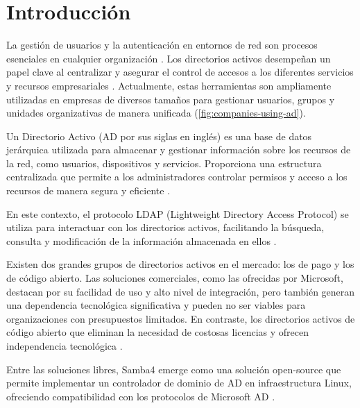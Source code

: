 \section{Introducción}

La gestión de usuarios y la autenticación en entornos de red son procesos esenciales en cualquier organización \autocite{thakur_user_2015-1, josang_local_2015, kizza_access_2024}. Los directorios activos desempeñan un papel clave al centralizar y asegurar el control de accesos a los diferentes servicios y recursos empresariales \autocite{kizza_access_2024}. Actualmente, estas herramientas son ampliamente utilizadas en empresas de diversos tamaños para gestionar usuarios, grupos y unidades organizativas de manera unificada (\autoref{fig:companies-using-ad}).

Un Directorio Activo (AD por sus siglas en inglés) es una base de datos jerárquica utilizada para almacenar y gestionar información sobre los recursos de la red, como usuarios, dispositivos y servicios. Proporciona una estructura centralizada que permite a los administradores controlar permisos y acceso a los recursos de manera segura y eficiente  \autocite{allen_active_2003,thakur_user_2015,carter_ldap_2003,francis_mastering_2021,smirnov_building_2024}.

En este contexto, el protocolo LDAP (Lightweight Directory Access Protocol) se utiliza para interactuar con los directorios activos, facilitando la búsqueda, consulta y modificación de la información almacenada en ellos \autocite{harrison_lightweight_2006,sermersheim_lightweight_2006,bartlett_samba_2005,voglmaier_abcs_2003,redhat_what_2022,janice_ldap_2023}.

Existen dos grandes grupos de directorios activos en el mercado: los de pago y los de código abierto. Las soluciones comerciales, como las ofrecidas por Microsoft, destacan por su facilidad de uso y alto nivel de integración, pero también generan una dependencia tecnológica significativa y pueden no ser viables para organizaciones con presupuestos limitados. En contraste, los directorios activos de código abierto que eliminan la necesidad de costosas licencias y ofrecen independencia tecnológica \autocite{thakur_user_2015-1,bartlett_samba_2005,imanudin_active_2019,boulanger_open-source_2005,bonaccorsi_why_2003}.

Entre las soluciones libres, Samba4 emerge como una solución open-source que permite implementar un controlador de dominio de AD en infraestructura Linux, ofreciendo compatibilidad con los protocolos de Microsoft AD \autocite{samba_what_2019,bartlett_samba_2005,carter_using_2007,imanudin_active_2019}.


